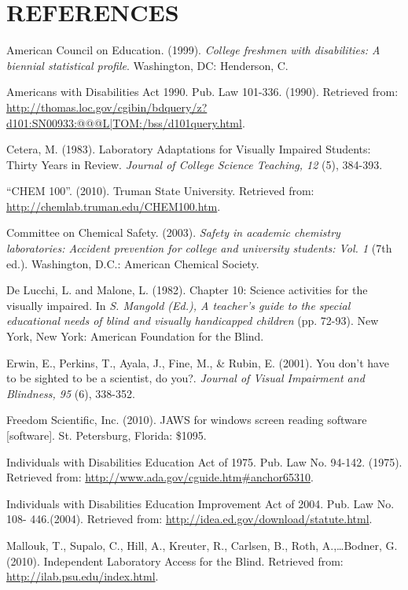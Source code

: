 \documentclass[11.5pt]{sig-alternate} %
\begin{document}
\section*{REFERENCES}\par 

\leftskip 0.25in
\parindent -0.25in 
American Council on Education. (1999). \textit{College freshmen with disabilities: A biennial statistical profile}. Washington, DC: Henderson, C. 

Americans with Disabilities Act 1990. Pub. Law 101-336. (1990). Retrieved from: \url{http://thomas.loc.gov/cgibin/bdquery/z?d101:SN00933:@@@L|TOM:/bss/d101query.html}.  

Cetera, M. (1983). Laboratory Adaptations for Visually Impaired Students: Thirty Years in Review. \textit{Journal of College Science Teaching, 12} (5), 384-393. 

“CHEM 100”. (2010). Truman State University. Retrieved from:
\url{http://chemlab.truman.edu/CHEM100.htm}. 

Committee on Chemical Safety. (2003). \textit{Safety in academic chemistry laboratories: Accident prevention for college and university students: Vol. 1} (7th ed.). Washington, D.C.: American Chemical Society. 

De Lucchi, L. and Malone, L. (1982). Chapter 10: Science activities for the visually impaired. In \textit{S. Mangold (Ed.), A teacher’s guide to the special educational needs of blind and visually handicapped children} (pp. 72-93). New York, New York: American Foundation for the Blind. 

Erwin, E., Perkins, T., Ayala, J., Fine, M., \& Rubin, E. (2001). You don’t have to be sighted to be a scientist, do you?. \textit{Journal of Visual Impairment and Blindness, 95} (6), 338-352. 

Freedom Scientific, Inc. (2010). JAWS for windows screen reading software [software]. St. Petersburg, Florida: \$1095. 

Individuals with Disabilities Education Act of 1975. Pub. Law No. 94-142. (1975). Retrieved from: \url{http://www.ada.gov/cguide.htm#anchor65310}.

Individuals with Disabilities Education Improvement Act of 2004. Pub. Law No. 108- 446.(2004). Retrieved from: \url{http://idea.ed.gov/download/statute.html}. 

Mallouk, T., Supalo, C., Hill, A., Kreuter, R., Carlsen, B., Roth, A.,…Bodner, G. (2010). Independent Laboratory Access for the Blind. Retrieved from: \url{http://ilab.psu.edu/index.html}. 
\end{document}
